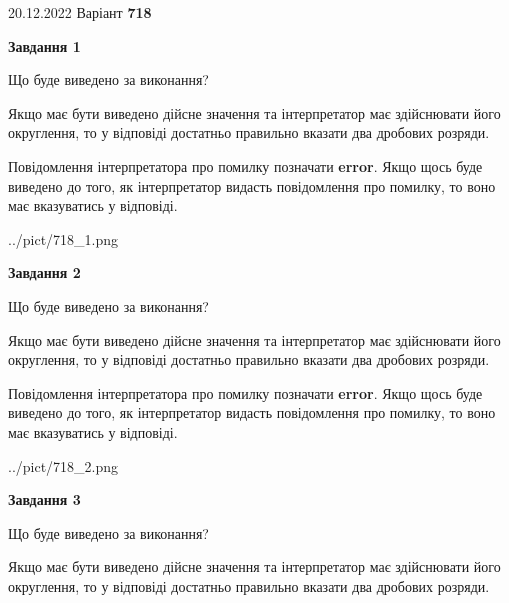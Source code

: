 \documentclass[12pt, ukrainian]{article}
\begin{document}
{20.12.2022 Варіант \No \textbf { 718 }\par}
{
\begin {Large}

{\begin {center}\textbf{Завдання 1}\end {center}}\par
Що буде виведено за виконання? \par

Якщо має бути виведено дійсне значення та інтерпретатор має здійснювати його округлення, 
то у відповіді достатньо правильно вказати два дробових розряди.

Повідомлення інтерпретатора про помилку позначати \textbf{error}.
Якщо щось буде виведено до того, як інтерпретатор видасть повідомлення про помилку, 
то воно має вказуватись у відповіді. \par

\begin{center}
	{../pict/718_1.png}
\end{center}
\newpage

{\begin {center}\textbf{Завдання 2}\end {center}}\par
Що буде виведено за виконання? \par

Якщо має бути виведено дійсне значення та інтерпретатор має здійснювати його округлення, 
то у відповіді достатньо правильно вказати два дробових розряди.

Повідомлення інтерпретатора про помилку позначати \textbf{error}.
Якщо щось буде виведено до того, як інтерпретатор видасть повідомлення про помилку, 
то воно має вказуватись у відповіді. \par

\begin{center}
	{../pict/718_2.png}
\end{center}
\newpage

{\begin {center}\textbf{Завдання 3}\end {center}}\par
Що буде виведено за виконання? \par

Якщо має бути виведено дійсне значення та інтерпретатор має здійснювати його округлення, 
то у відповіді достатньо правильно вказати два дробових розряди.


\end{Large}}
\end{document}
